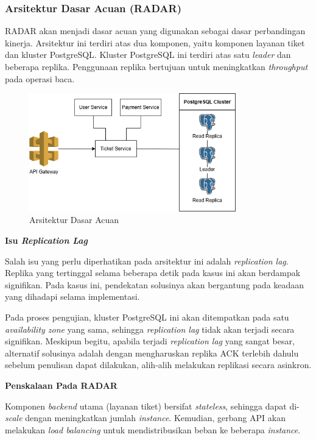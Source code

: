 \subsubsection{Arsitektur Dasar Acuan (RADAR)}

RADAR akan menjadi dasar acuan yang digunakan sebagai dasar perbandingan kinerja. Arsitektur ini terdiri atas dua komponen, yaitu komponen layanan tiket dan kluster PostgreSQL. Kluster PostgreSQL ini terdiri atas satu \textit{leader} dan beberapa replika. Penggunaan replika bertujuan untuk meningkatkan \textit{throughput} pada operasi baca.

\begin{figure}[htbp]
    \centering
    \includegraphics[width=0.8\textwidth]{resources/appendix/architecture-reference.png}
    \caption{Arsitektur Dasar Acuan}
    \label{fig:baseline-architecture}
\end{figure}

\textbf{Isu \textit{Replication Lag}}

Salah isu yang perlu diperhatikan pada arsitektur ini adalah \textit{replication lag}. Replika yang tertinggal selama beberapa detik pada kasus ini akan berdampak signifikan. Pada kasus ini, pendekatan solusinya akan bergantung pada keadaan yang dihadapi selama implementasi.

Pada proses pengujian, kluster PostgreSQL ini akan ditempatkan pada satu \textit{availability zone} yang sama, sehingga \textit{replication lag} tidak akan terjadi secara signifikan. Meskipun begitu, apabila terjadi \textit{replication lag} yang sangat besar, alternatif solusinya adalah dengan mengharuskan replika ACK terlebih dahulu sebelum penulisan dapat dilakukan, alih-alih melakukan replikasi secara asinkron.

\textbf{Penskalaan Pada RADAR}

Komponen \textit{backend} utama (layanan tiket) bersifat \textit{stateless}, sehingga dapat di-\textit{scale} dengan meningkatkan jumlah \textit{instance}. Kemudian, gerbang API akan melakukan \textit{load balancing} untuk mendistribusikan beban ke beberapa \textit{instance}.

